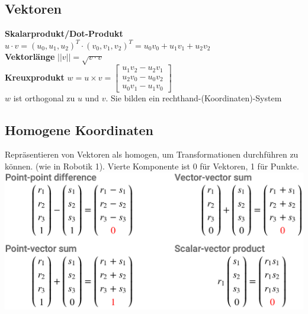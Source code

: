 \documentclass[12pt]{article}
\begin{document}
	\subsection{Vektoren}
	\textbf{Skalarprodukt/Dot-Produkt} $u \cdot v = (u_0, u_1, u_2)^T \cdot (v_0, v_1, v_2)^T = u_0 v_0 + u_1 v_1 + u_2 v_2$\\
	\textbf{Vektorlänge} $||v|| = \sqrt{v \cdot v}$\\
	\textbf{Kreuxprodukt} $w = u \times v = 
		\begin{bmatrix}
			u_1 v_2 - u_2 v_1\\
			u_2 v_0 - u_0 v_2\\
			u_0 v_1 - u_1 v_0
		\end{bmatrix}$\\
	$w$ ist orthogonal zu $u$ und $v$. Sie bilden ein rechthand-(Koordinaten)-System

	\subsection{Homogene Koordinaten}
	Repräsentieren von Vektoren als homogen, um Transformationen durchführen zu können. (wie in Robotik 1). Vierte Komponente ist 0 für Vektoren, 1 für Punkte.\\
	\includegraphics[width=\linewidth]{figures/homogene-koordinaten.png}
\end{document}
